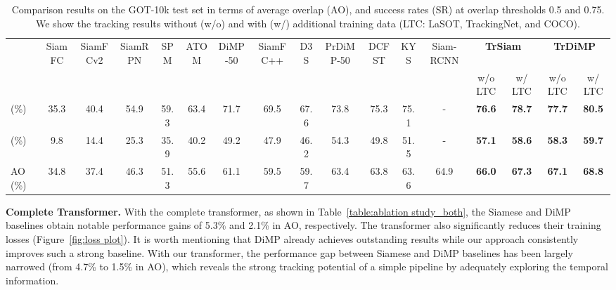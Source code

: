 \documentclass[10pt,twocolumn,letterpaper]{article}
\begin{document}
\setlength{\tabcolsep}{2pt}
\begin{table*}[t]
	\scriptsize
	\begin{center}
		\caption{Comparison results on the GOT-10k test set \cite{GOT10k} in terms of average overlap (AO), and success rates (SR) at overlap thresholds 0.5 and 0.75. We show the tracking results without (w/o) and with (w/) additional training data (LTC: LaSOT, TrackingNet, and COCO).} \label{table:got10k}	
		\begin{tabular*}{17.5 cm} {@{\extracolsep{\fill}}lcccccccccccccccc}
			\hline
			~   &SiamFC &SiamFCv2 &SiamRPN &SPM &ATOM &DiMP-50 &SiamFC++ &D3S &PrDiMP-50 &DCFST &KYS &Siam-RCNN &\multicolumn{2}{c}{\bf TrSiam} &\multicolumn{2}{c}{\bf TrDiMP}\\
			~   &\cite{SiamFC} &\cite{CFNet} &\cite{SiamRPN} &\cite{SPM} &\cite{ATOM} &\cite{DiMP} &\cite{SiamFC++} &\cite{D3S} &\cite{PrDiMP} &\cite{DCFST} &\cite{KYS} &\cite{SiamRCNN} &w/o LTC  &w/ LTC &w/o LTC &w/ LTC\\
			\hline
			
			(\%)   &35.3 &40.4 &54.9 &59.3 &63.4 &71.7 &69.5 &67.6 &73.8 &75.3 &75.1 &- &{\bf \color{blue} 76.6} &{\bf \textcolor[rgb]{0.5,0.5,0.5}{78.7}} &{\bf \color{red} 77.7} &{\bf \textcolor[rgb]{0.5,0.5,0.5}{80.5}}\\
			
			(\%)   &9.8 &14.4 &25.3 &35.9 &40.2 &49.2 &47.9 &46.2 &54.3 &49.8 &51.5 &- &{\bf \color{blue} 57.1} &{\bf \textcolor[rgb]{0.5,0.5,0.5}{58.6}} &{\bf \color{red} 58.3} &{\bf \textcolor[rgb]{0.5,0.5,0.5}{59.7}}\\
			
			AO (\%) &34.8 &37.4 &46.3 &51.3 &55.6 &61.1 &59.5 &59.7 &63.4 &63.8 &63.6 &64.9 &{\bf \color{blue} 66.0} &{\bf \textcolor[rgb]{0.5,0.5,0.5}{67.3}} &{\bf \color{red} 67.1} &{\bf \textcolor[rgb]{0.5,0.5,0.5}{68.8}}\\
			\hline
		\end{tabular*}
	\end{center}
	\vspace{-0.15in}
\end{table*} 




{\noindent \bf Complete Transformer.} 
With the complete transformer, as shown in Table~\ref{table:ablation study_both}, the Siamese and DiMP baselines obtain notable performance gains of 5.3\% and 2.1\% in AO, respectively.
The transformer also significantly reduces their training losses (Figure~\ref{fig:loss plot}).
It is worth mentioning that DiMP already achieves outstanding results while our approach consistently improves such a strong baseline.
With our transformer, the performance gap between Siamese and DiMP baselines has been largely narrowed (from 4.7\% to 1.5\% in AO), which reveals the strong tracking potential of a simple pipeline by adequately exploring the temporal information.
\end{document}
